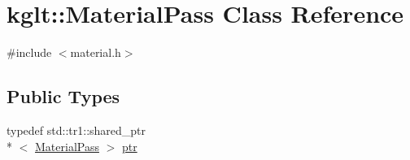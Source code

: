 \hypertarget{classkglt_1_1_material_pass}{\section{kglt\-:\-:Material\-Pass Class Reference}
\label{classkglt_1_1_material_pass}
}


{\ttfamily \#include $<$material.\-h$>$}

\subsection*{Public Types}
\begin{DoxyCompactItemize}
\item 
typedef std\-::tr1\-::shared\-\_\-ptr\\*
$<$ \hyperlink{classkglt_1_1_material_pass}{Material\-Pass} $>$ \hyperlink{classkglt_1_1_material_pass_ace1863609e03620a2e7daf1c29af7849}{ptr}
\end{DoxyCompactItemize}
